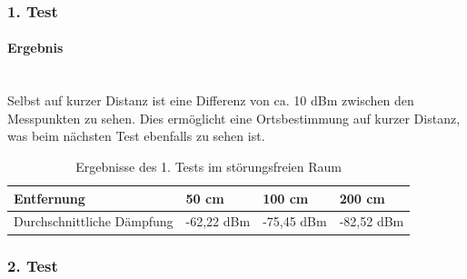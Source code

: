 \documentclass[a4paper]{spie}  %
\begin{document}
\subsubsection{1. Test}

\paragraph{Ergebnis}\mbox{}\\
Selbst auf kurzer Distanz ist eine Differenz von ca. 10 dBm zwischen den Messpunkten zu sehen. Dies ermöglicht eine Ortsbestimmung auf kurzer Distanz, was beim nächsten Test ebenfalls zu sehen ist.

\begin{table}[H]
\centering
	\begin{tabular}{ | p{2.5cm} | l | l | l | }
		\hline 
		Entfernung	& 50 cm	& 100 cm	& 200 cm	\\ \hline
		Durchschnittliche Dämpfung & -62,22 dBm	& -75,45 dBm	& -82,52 dBm \\
		\hline
	\end{tabular}
	\caption{Ergebnisse des 1. Tests im störungsfreien Raum}
	\label{tab:probeTab}
\end{table}

\subsubsection{2. Test}\label{testNr2}
\end{document}
